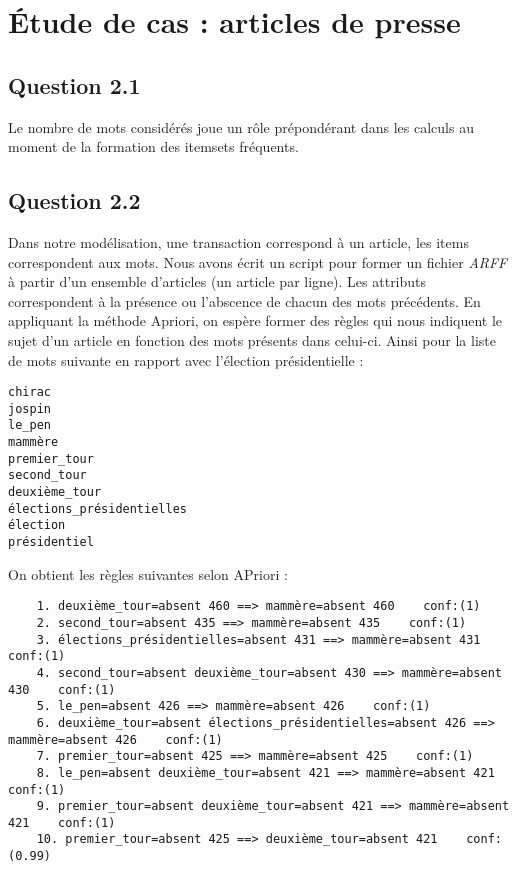 \documentclass[a4paper,12pt]{article}
\begin{document}
\section{\'Etude de cas : articles de presse}

\subsection*{Question 2.1}

Le nombre de mots considérés joue un rôle prépondérant dans les calculs au moment de la formation des itemsets fréquents.


\subsection*{Question 2.2}

Dans notre modélisation, une transaction correspond à un article, les items correspondent aux mots.
Nous avons écrit un script pour former un fichier \textit{ARFF} à partir d'un ensemble d'articles (un article par ligne).
Les attributs correspondent à la présence ou l'abscence de chacun des mots précédents.
En appliquant la méthode Apriori, on espère former des règles qui nous indiquent le sujet d'un article en fonction des mots présents dans celui-ci.
Ainsi pour la liste de mots suivante en rapport avec l'élection présidentielle :
\begin{lstlisting}
chirac
jospin
le_pen
mammère
premier_tour
second_tour
deuxième_tour
élections_présidentielles
élection
présidentiel
\end{lstlisting}

On obtient les règles suivantes selon APriori :
\begin{lstlisting}
	1. deuxième_tour=absent 460 ==> mammère=absent 460    conf:(1)
	2. second_tour=absent 435 ==> mammère=absent 435    conf:(1)
	3. élections_présidentielles=absent 431 ==> mammère=absent 431    conf:(1)
	4. second_tour=absent deuxième_tour=absent 430 ==> mammère=absent 430    conf:(1)
	5. le_pen=absent 426 ==> mammère=absent 426    conf:(1)
	6. deuxième_tour=absent élections_présidentielles=absent 426 ==> mammère=absent 426    conf:(1)
	7. premier_tour=absent 425 ==> mammère=absent 425    conf:(1)
	8. le_pen=absent deuxième_tour=absent 421 ==> mammère=absent 421    conf:(1)
	9. premier_tour=absent deuxième_tour=absent 421 ==> mammère=absent 421    conf:(1)
	10. premier_tour=absent 425 ==> deuxième_tour=absent 421    conf:(0.99)
\end{lstlisting}
\end{document}
